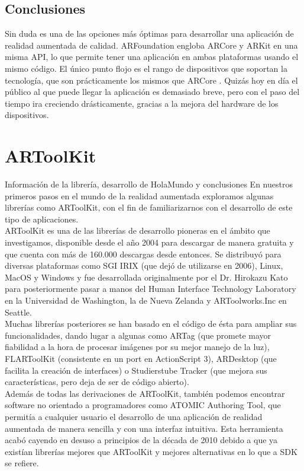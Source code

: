 \subsection{Conclusiones}
Sin duda es una de las opciones más óptimas para desarrollar una aplicación de realidad aumentada de calidad. ARFoundation engloba ARCore y ARKit en una misma API, lo que permite tener una aplicación en ambas plataformas usando el mismo código. El único punto flojo es el rango de dispositivos que soportan la tecnología, que son prácticamente los mismos que ARCore \cite{ARCoreList}. Quizás hoy en día el público al que puede llegar la aplicación es demasiado breve, pero con el paso del tiempo ira creciendo drásticamente, gracias a la mejora del hardware de los dispositivos.

\clearpage
\section{ARToolKit}
Información de la librería, desarrollo de HolaMundo y conclusiones
En nuestros primeros pasos en el mundo de la realidad aumentada exploramos algunas librerías como ARToolKit, con el fin de familiarizarnos con el desarrollo de este tipo de aplicaciones.\\

ARToolKit es una de las librerías de desarrollo pioneras en el ámbito que investigamos, disponible desde el año 2004 para descargar de manera gratuita y que cuenta con más de 160.000 descargas desde entonces. Se distribuyó para diversas plataformas como SGI IRIX (que dejó de utilizarse en 2006), Linux, MacOS y Windows y fue desarrollada originalmente por el Dr. Hirokazu Kato para posteriormente pasar a manos del Human Interface Technology Laboratory en la Universidad de Washington, la de Nueva Zelanda y ARToolworks.Inc en Seattle.\\

Muchas librerías posteriores se han basado en el código de ésta para ampliar sus funcionalidades, dando lugar a algunas como ARTag (que promete mayor fiabilidad a la hora de procesar imágenes por su mejor manejo de la luz), FLARToolKit (consistente en un port en ActionScript 3), ARDesktop (que facilita la creación de interfaces) o Studierstube Tracker (que mejora sus características, pero deja de ser de código abierto).\\
Además de todas las derivaciones de ARToolKit, también podemos encontrar software no orientado a programadores como ATOMIC Authoring Tool, que permitía a cualquier usuario el desarrollo de una aplicación de realidad aumentada de manera sencilla y con una interfaz intuitiva. Esta herramienta acabó cayendo en desuso a principios de la década de 2010 debido a que ya existían librerías mejores que ARToolKit y mejores alternativas en lo que a SDK se refiere.\\

